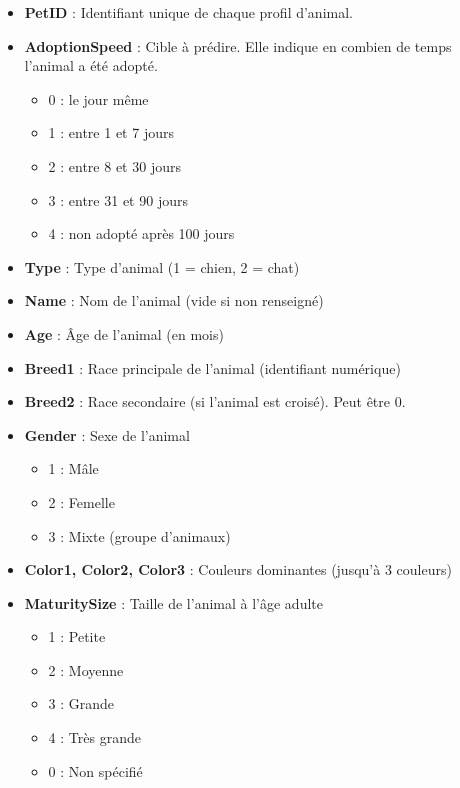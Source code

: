 \documentclass[a4paper,12pt]{article}
\begin{document}
\begin{itemize}
    \item \textbf{PetID} : Identifiant unique de chaque profil d’animal.
    \item \textbf{AdoptionSpeed} : Cible à prédire. Elle indique en combien de temps l’animal a été adopté.
          \begin{itemize}
              \item 0 : le jour même
              \item 1 : entre 1 et 7 jours
              \item 2 : entre 8 et 30 jours
              \item 3 : entre 31 et 90 jours
              \item 4 : non adopté après 100 jours
          \end{itemize}

    \item \textbf{Type} : Type d’animal (1 = chien, 2 = chat)
    \item \textbf{Name} : Nom de l’animal (vide si non renseigné)
    \item \textbf{Age} : Âge de l’animal (en mois)

    \item \textbf{Breed1} : Race principale de l’animal (identifiant numérique)
    \item \textbf{Breed2} : Race secondaire (si l’animal est croisé). Peut être 0.

    \item \textbf{Gender} : Sexe de l’animal
          \begin{itemize}
              \item 1 : Mâle
              \item 2 : Femelle
              \item 3 : Mixte (groupe d’animaux)
          \end{itemize}

    \item \textbf{Color1, Color2, Color3} : Couleurs dominantes (jusqu’à 3 couleurs)

    \item \textbf{MaturitySize} : Taille de l’animal à l’âge adulte
          \begin{itemize}
              \item 1 : Petite
              \item 2 : Moyenne
              \item 3 : Grande
              \item 4 : Très grande
              \item 0 : Non spécifié
          \end{itemize}


\end{itemize}
\end{document}
